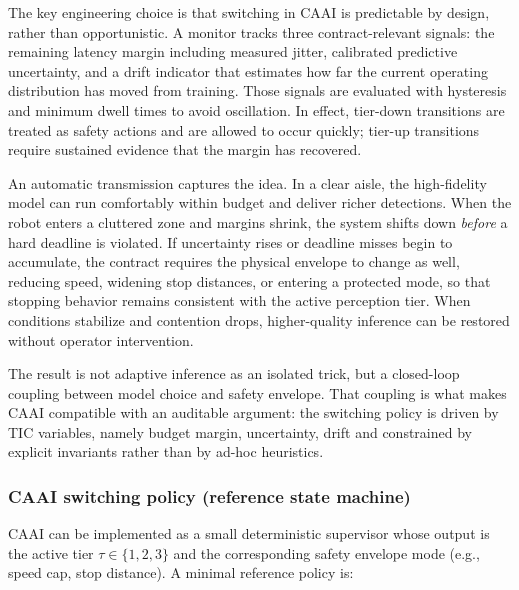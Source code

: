 \documentclass[smallextended]{svjour3}
\begin{document}
The key engineering choice is that switching in CAAI is predictable by design, rather than opportunistic. A monitor tracks three contract-relevant signals: the remaining latency margin including measured jitter, calibrated predictive uncertainty, and a drift indicator that estimates how far the current operating distribution has moved from training. Those signals are evaluated with hysteresis and minimum dwell times to avoid oscillation. In effect, tier-down transitions are treated as safety actions and are allowed to occur quickly; tier-up transitions require sustained evidence that the margin has recovered.


An automatic transmission captures the idea. In a clear aisle, the high-fidelity model can run comfortably within budget and deliver richer detections. When the robot enters a cluttered zone and margins shrink, the system shifts down \emph{before} a hard deadline is violated. If uncertainty rises or deadline misses begin to accumulate, the contract requires the physical envelope to change as well, reducing speed, widening stop distances, or entering a protected mode, so that stopping behavior remains consistent with the active perception tier. When conditions stabilize and contention drops, higher-quality inference can be restored without operator intervention.

The result is not adaptive inference as an isolated trick, but a closed-loop coupling between model choice and safety envelope. That coupling is what makes CAAI compatible with an auditable argument: the switching policy is driven by TIC variables, namely budget margin, uncertainty, drift and constrained by explicit invariants rather than by ad-hoc heuristics.

\subsubsection{CAAI switching policy (reference state machine)}
\label{sec:caai_policy}

CAAI can be implemented as a small deterministic supervisor whose output is the
active tier $\tau \in \{1,2,3\}$ and the corresponding safety envelope mode
(e.g., speed cap, stop distance). A minimal reference policy is:
\end{document}
